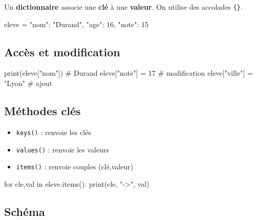 \documentclass[11pt]{article}
\begin{document}
	
	
	
	Un \textbf{dictionnaire} associe une \textbf{clé} à une \textbf{valeur}.  
	On utilise des accolades \texttt{\{\}}.
	
	\begin{python}
		eleve = {
			"nom": "Durand",
			"age": 16,
			"note": 15
		}
	\end{python}
	
	\subsection*{Accès et modification}
	
	\begin{python}
		print(eleve["nom"])    # Durand
		eleve["note"] = 17     # modification
		eleve["ville"] = "Lyon" # ajout
	\end{python}
	
	\subsection*{Méthodes clés}
	
	\begin{itemize}
		\item \texttt{keys()} : renvoie les clés  
		\item \texttt{values()} : renvoie les valeurs  
		\item \texttt{items()} : renvoie couples (clé,valeur)
	\end{itemize}
	
	\begin{python}
		for cle,val in eleve.items():
		print(cle, "->", val)\end{python}
	
	\subsection*{Schéma}
	
	
	
	
	
	
	
\end{document}
